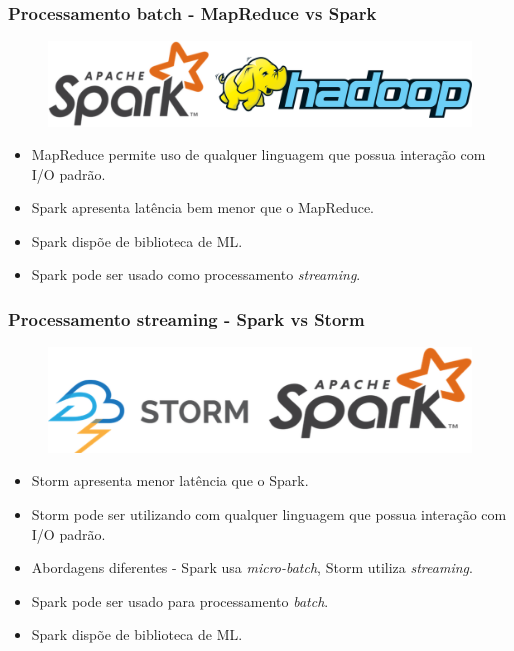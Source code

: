 \documentclass{beamer}
\begin{document}
  \begin{frame}
      \frametitle{Processamento batch - MapReduce vs Spark}
      \begin{figure}
          \includegraphics[scale=0.3]{figures/BatchProcessing.png}
      \end{figure}
      \begin{itemize}
          \item MapReduce permite uso de qualquer linguagem que possua interação
              com I/O padrão.
          \item Spark apresenta latência bem menor que o MapReduce.
          \item Spark dispõe de biblioteca de ML.
          \item Spark pode ser usado como processamento \textit{streaming}.
      \end{itemize}
  \end{frame}

  \begin{frame}
      \frametitle{Processamento streaming - Spark vs Storm}
      \begin{figure}
          \includegraphics[scale=0.6]{figures/StreamingProcessing.png}
      \end{figure}
      \begin{itemize}
          \item Storm apresenta menor latência que o Spark.
          \item Storm pode ser utilizando com qualquer linguagem que possua
              interação com I/O padrão.
          \item Abordagens diferentes - Spark usa \textit{micro-batch}, Storm utiliza
              \textit{streaming}.
          \item Spark pode ser usado para processamento \textit{batch}.
          \item Spark dispõe de biblioteca de ML.
      \end{itemize}
  \end{frame}
\end{document}
